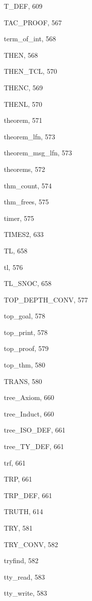 \begin{theindex}
  \indexspace

  \item {\ptt T\_DEF}, 609
  \item {\ptt TAC\_PROOF}, 567
  \item {\ptt term\_of\_int}, 568
  \item {\ptt THEN}, 568
  \item {\ptt THEN\_TCL}, 570
  \item {\ptt THENC}, 569
  \item {\ptt THENL}, 570
  \item {\ptt theorem}, 571
  \item {\ptt theorem\_lfn}, 573
  \item {\ptt theorem\_msg\_lfn}, 573
  \item {\ptt theorems}, 572
  \item {\ptt thm\_count}, 574
  \item {\ptt thm\_frees}, 575
  \item {\ptt timer}, 575
  \item {\ptt TIMES2}, 633
  \item {\ptt TL}, 658
  \item {\ptt tl}, 576
  \item {\ptt TL\_SNOC}, 658
  \item {\ptt TOP\_DEPTH\_CONV}, 577
  \item {\ptt top\_goal}, 578
  \item {\ptt top\_print}, 578
  \item {\ptt top\_proof}, 579
  \item {\ptt top\_thm}, 580
  \item {\ptt TRANS}, 580
  \item {\ptt tree\_Axiom}, 660
  \item {\ptt tree\_Induct}, 660
  \item {\ptt tree\_ISO\_DEF}, 661
  \item {\ptt tree\_TY\_DEF}, 661
  \item {\ptt trf}, 661
  \item {\ptt TRP}, 661
  \item {\ptt TRP\_DEF}, 661
  \item {\ptt TRUTH}, 614
  \item {\ptt TRY}, 581
  \item {\ptt TRY\_CONV}, 582
  \item {\ptt tryfind}, 582
  \item {\ptt tty\_read}, 583
  \item {\ptt tty\_write}, 583

\end{theindex}
